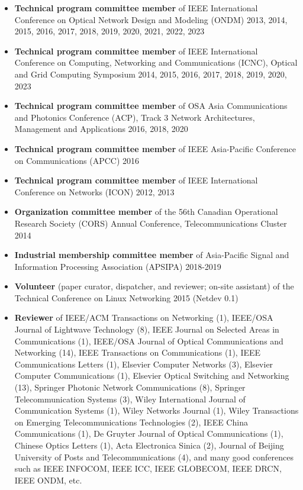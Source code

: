 \documentclass[letterpaper,11pt]{article}
\begin{document}
\begin{CJK}{UTF8}{gbsn}
\begin{itemize}
\item
\textbf{Technical program committee member} of IEEE International Conference on Optical Network Design and Modeling (ONDM)
2013, 2014, 2015, 2016, 2017, 2018, 2019, 2020, 2021, 2022, 2023

\item
\textbf{Technical program committee member} of IEEE International Conference on Computing, Networking and Communications (ICNC),
Optical and Grid Computing Symposium 2014, 2015, 2016, 2017, 2018, 2019, 2020, 2023

\item
\textbf{Technical program committee member} of OSA Asia Communications and Photonics Conference (ACP),
Track 3 Network Architectures, Management and Applications 2016, 2018, 2020

\item
\textbf{Technical program committee member} of IEEE Asia-Pacific Conference on Communications (APCC) 2016

\item
\textbf{Technical program committee member} of IEEE International Conference on Networks (ICON) 2012, 2013

\item
\textbf{Organization committee member} of the 56th Canadian Operational Research Society (CORS) Annual Conference, Telecommunications Cluster 2014

\item
\textbf{Industrial membership committee member} of Asia-Pacific Signal and Information Processing Association (APSIPA) 2018-2019

\item
\textbf{Volunteer} (paper curator, dispatcher, and reviewer; on-site assistant) of the Technical Conference on Linux Networking 2015 (Netdev 0.1)

\item
\textbf{Reviewer} of IEEE/ACM Transactions on Networking (1), IEEE/OSA Journal of Lightwave Technology (8),
IEEE Journal on Selected Areas in Communications (1),
IEEE/OSA Journal of Optical Communications and Networking (14), IEEE Transactions on Communications (1), IEEE Communications Letters (1),
Elsevier Computer Networks (3), Elsevier Computer Communications (1), Elsevier Optical Switching and Networking (13),
Springer Photonic Network Communications (8), Springer Telecommunication Systems (3), Wiley International Journal of Communication Systems (1),
Wiley Networks Journal (1), Wiley Transactions on Emerging Telecommunications Technologies (2), IEEE China Communications (1),
De Gruyter Journal of Optical Communications (1), Chinese Optics Letters (1),
Acta Electronica Sinica (2), Journal of Beijing University of Posts and Telecommunications (4),
and many good conferences such as IEEE INFOCOM, IEEE ICC, IEEE GLOBECOM, IEEE DRCN, IEEE ONDM, etc.


\end{itemize}
\end{CJK}
\end{document}
